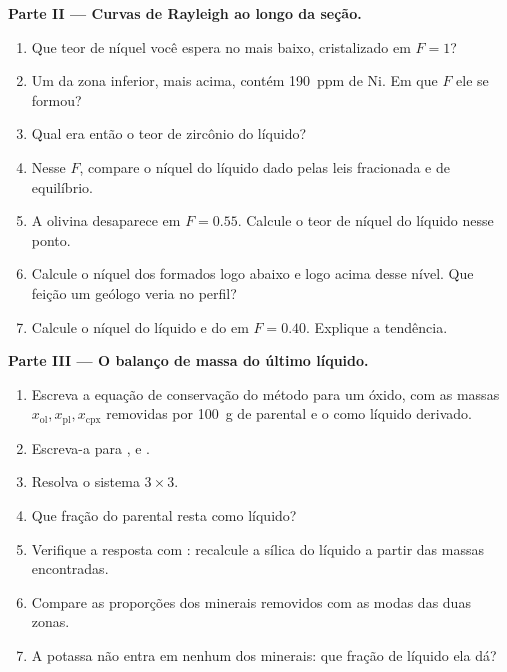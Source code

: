 \begin{problem}
\noindent\textbf{Parte II --- Curvas de Rayleigh ao longo da seção.}
\begin{enumerate}[resume]
\item Que teor de níquel você espera no  mais baixo, cristalizado em
$F = 1$?
\item Um  da zona inferior, mais acima, contém \qty{190}{ppm} de Ni. Em que $F$ ele
se formou?
\item Qual era então o teor de zircônio do líquido?
\item Nesse $F$, compare o níquel do líquido dado pelas leis fracionada e de
equilíbrio.
\item A olivina desaparece em $F = 0.55$. Calcule o teor de níquel do líquido
nesse ponto.
\item Calcule o níquel dos  formados logo abaixo e logo acima desse
nível. Que feição um geólogo veria no perfil?
\item Calcule o níquel do líquido e do  em $F = 0.40$. Explique
a tendência.
\end{enumerate}

\noindent\textbf{Parte III --- O balanço de massa do último líquido.}
\begin{enumerate}[resume]
\item Escreva a equação de conservação do método para um óxido, com as massas
$x_{\mathrm{ol}}, x_{\mathrm{pl}}, x_{\mathrm{cpx}}$ removidas por \qty{100}{g} de
 parental e o  como líquido derivado.
\item Escreva-a para ,  e .
\item Resolva o sistema $3 \times 3$.
\item Que fração do  parental resta como líquido?
\item Verifique a resposta com : recalcule a sílica do líquido a partir das
massas encontradas.
\item Compare as proporções dos minerais removidos com as modas das duas
zonas.
\item A potassa não entra em nenhum dos minerais: que fração de líquido ela dá?
\end{enumerate}


\end{problem}
